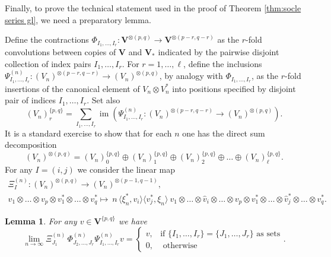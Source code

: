 \documentclass[12pt,reqno]{amsart}
\numberwithin{equation}{section}
\theoremstyle{plain}
\newtheorem{lem}[thm]{Lemma}
\theoremstyle{definition}
\def\im{\operatorname{im}}
\def\o{\otimes}
\def\VV{\mathbf V}
\def\<{\langle}
\def\>{\rangle}
\def\({\left(}
\def\){\right)}
\begin{document}
\bigskip



Finally, to prove the technical statement used in the proof of Theorem \ref{thm:socle series gl}, we need a preparatory lemma.

Define the contractions $\Phi_{I_1,\dots,I_r}: \VV^{\o(p,q)} \to \VV^{\o(p-r,q-r)}$ as the $r$-fold
convolutions between copies of $\VV$ and $\VV_*$ indicated by the
pairwise disjoint collection of index pairs $I_1,\dots,I_r$.
For $r=1,\dots,\ell$, define the inclusions
$\Psi_{I_1,\dots,I_r}^{(n)}: (V_n)^{\o(p-r,q-r)} \to
(V_n)^{\o(p,q)}$, by analogy with $\Phi_{I_1,\dots,I_r}$, as the
$r$-fold insertions of the canonical element of $V_n \o V_n^*$ into
positions specified by disjoint pair of indices $I_1,\dots,I_r$. Set
also
\begin{equation*}
    (V_n)^{ \{p,q\} }_r = \sum_{I_1,\dots,I_r} \im \(
    \Psi_{I_1,\dots,I_r}^{(n)} :(V_n)^{\o(p-r,q-r)} \to
    (V_n)^{\o(p,q)} \).
\end{equation*}
It is a standard exercise to show that for each $n$ one has the
direct sum decomposition
\begin{equation*}
    (V_n)^{\o (p, q)} = (V_n)^{ \{p,q\} }_0 \oplus  (V_n)^{ \{p,q\} }_1 \oplus (V_n)^{ \{p,q\} }_2
    \oplus \dots \oplus (V_n)^{ \{p,q\} }_\ell.
\end{equation*}
For any $I = (i,j)$ we consider the linear map
\begin{equation*}
\begin{gathered}
    \Xi^{(n)}_I: (V_n)^{\o (p,q)} \to (V_n)^{\o (p-1,q-1)},\\
    v_1 \o\dots\o v_p \o v^*_1 \o\dots\o v^*_q \mapsto \
    n\, \<\xi_n^*,v_i\> \<v_j^*,\xi_n\> \ v_1 \o \dots \o \hat v_i \o \dots \o v_p \o v^*_1 \o\dots \o \hat v_j^* \o \dots \o v_q^*.
\end{gathered}
\end{equation*}
\begin{lem}\label{thm:asymptotics lemma}
For any $v \in \VV^{\{p,q\}}$ we have
\begin{equation*}
    \lim_{n\to \infty} \Xi^{(n)}_{J_1} \, \Phi_{J_2,\dots,J_r}^{(n)}
    \Psi_{I_1,\dots,I_r}^{(n)} v =
    \begin{cases}
        v, & \text{if $\{I_1,\dots,I_r\} = \{J_1,\dots,J_r\}$ as
        sets}\\
        0, & \text{ otherwise}
    \end{cases}.
\end{equation*}
\end{lem}
\end{document}
